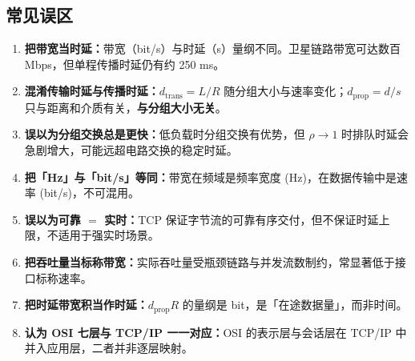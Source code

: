 \subsection{常见误区}
\begin{enumerate}
    \item \textbf{把带宽当时延：}带宽（bit/s）与时延（s）量纲不同。卫星链路带宽可达数百 Mbps，但单程传播时延仍有约 250 ms。
    \item \textbf{混淆传输时延与传播时延：}$d_{\text{trans}}=L/R$ 随分组大小与速率变化；$d_{\text{prop}}=d/s$ 只与距离和介质有关，\textbf{与分组大小无关}。
    \item \textbf{误以为分组交换总是更快：}低负载时分组交换有优势，但 $\rho\to1$ 时排队时延会急剧增大，可能远超电路交换的稳定时延。
    \item \textbf{把「Hz」与「bit/s」等同：}带宽在频域是频率宽度 (Hz)，在数据传输中是速率 (bit/s)，不可混用。
    \item \textbf{误以为可靠 $=$ 实时：}TCP 保证字节流的可靠有序交付，但不保证时延上限，不适用于强实时场景。
    \item \textbf{把吞吐量当标称带宽：}实际吞吐量受瓶颈链路与并发流数制约，常显著低于接口标称速率。
    \item \textbf{把时延带宽积当作时延：}$d_{\text{prop}}R$ 的量纲是 bit，是「在途数据量」，而非时间。
    \item \textbf{认为 OSI 七层与 TCP/IP 一一对应：}OSI 的表示层与会话层在 TCP/IP 中并入应用层，二者并非逐层映射。
\end{enumerate}
